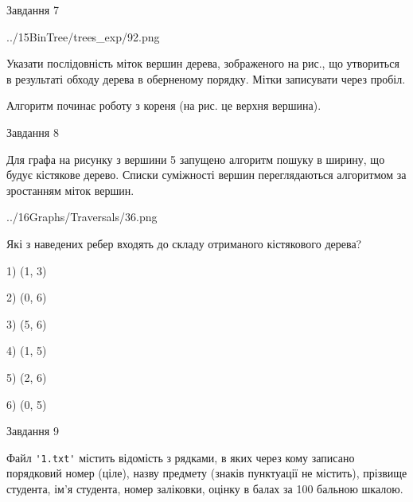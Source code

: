 \documentclass[12pt, ukrainian]{article}
\def\code#1{\Verb!#1!}
\begin{document}
{\vspace{10mm}\par

\newpage
\begin{minipage}[t]{9.7cm}
               
{\begin{center}Завдання {7}\end{center}}
\vspace{-4mm}

\begin{center}
	{../15BinTree/trees_exp/92.png}
\end{center}
Указати послідовність міток вершин дерева, зображеного на рис., що утвориться в результаті обходу дерева в оберненому порядку. Мітки записувати через пробіл.\par Алгоритм починає роботу з кореня (на рис. це верхня вершина).\par

\end{minipage}
\vline \hspace{8mm}
\begin{minipage}[t]{8.0cm}
               
{\begin{center}Завдання {8}\end{center}}
\vspace{-4mm}
Для графа на рисунку з вершини 5 запущено алгоритм пошуку в ширину, що будує кістякове дерево. Списки суміжності вершин переглядаються алгоритмом за зростанням міток вершин.\par
\begin{center}
	{../16Graphs/Traversals/36.png}
\end{center}
\par Які з наведених ребер входять до складу отриманого кістякового дерева?\par
1) (1, 3)\par
2) (0, 6)\par
3) (5, 6)\par
4) (1, 5)\par
5) (2, 6)\par
6) (0, 5)\par
{\vskip 15pt} \par

\end{minipage}

               
{\begin{center}Завдання {9}\end{center}}
\vspace{-4mm}
Файл \code{'1.txt'} містить відомість з рядками, в яких через кому записано поряд\-ковий номер (ціле), назву предмету (знаків пунктуації не містить), прізвище студента, ім'я студента, номер заліковки, оцінку в балах за 100 бальною шкалою.

}
\end{document}
